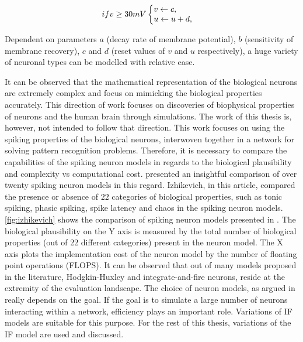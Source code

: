 \begin{equation}
if v\geq 30 mV\left\{
\begin{array}{@{}ll@{}}
v\leftarrow c, & \\
u\leftarrow u+d, & 
\end{array}\right.
\end{equation}

Dependent on parameters $a$ (decay rate of membrane potential), $b$ (sensitivity of membrane recovery), $c$ and $d$ (reset values of $v$ and $u$ respectively), a huge variety of neuronal types can be modelled with relative ease. 

It can be observed that the mathematical representation of the biological neurons are extremely complex and focus on mimicking the biological properties accurately. This direction of work focuses on discoveries of biophysical properties of neurons and the human brain through simulations. The work of this thesis is, however, not intended to follow that direction. This work focuses on using the spiking properties of the biological neurons, interwoven together in a network for solving pattern recognition problems. Therefore, it is necessary to compare the capabilities of the spiking neuron models in regards to the biological plausibility and complexity vs computational cost. \citet{izhikevich2004model} presented an insightful comparison of over twenty spiking neuron models in this regard. Izhikevich, in this article, compared the presence or absence of $22$ categories of biological properties, such as tonic spiking, phasic spiking, spike latency and chaos in the spiking neuron models. \figurename \ref{fig:izhikevich} shows the comparison of spiking neuron models presented in \citep{izhikevich2004model}. The biological plausibility on the Y axis is measured by the total number of biological properties (out of 22 different categories) present in the neuron model. The X axis plots the implementation cost of the neuron model by the number of floating point operations (FLOPS). It can be observed that out of many models proposed in the literature, Hodgkin-Huxley and integrate-and-fire neurons, reside at the extremity of the evaluation landscape. The choice of neuron models, as argued in \citep{izhikevich2004model} really depends on the goal. If the goal is to simulate a large number of neurons interacting within a network, efficiency plays an important role. Variations of IF models are suitable for this purpose. For the rest of this thesis, variations of the IF model are used and discussed.  
